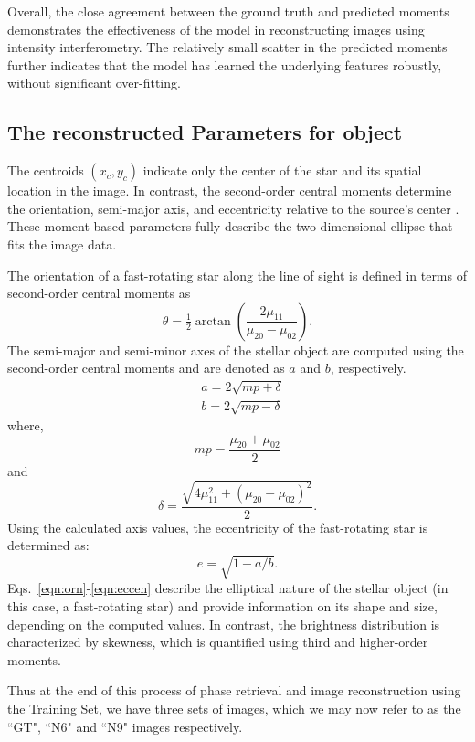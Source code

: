 Overall, the close agreement between the ground truth and predicted moments demonstrates the effectiveness of the model in reconstructing images using intensity interferometry. The relatively small scatter in the predicted moments further indicates that the model has learned the underlying features robustly, without significant over-fitting.

\subsection{The reconstructed Parameters for object}
The centroids \((x_c, y_c)\) indicate only the center of the star and its spatial location in the image. In contrast, the second-order central moments determine the orientation, semi-major axis, and eccentricity relative to the source's center \citep{teague1980image}. These moment-based parameters fully describe the two-dimensional ellipse that fits the image data.

The orientation of a fast-rotating star along the line of sight is defined in terms of second-order central moments as
\begin{equation}
	\theta = \tfrac{1}{2}\arctan \left(\frac{2\mu_{11}}{\mu_{20} - \mu_{02}}\right).
	\label{eqn:orn}
\end{equation}
The semi-major and semi-minor axes of the stellar object are computed using the second-order central moments and are denoted as \(a\) and \(b\), respectively.
\begin{equation}
	\begin{aligned}
		&a = 2\sqrt{mp + \delta} \\
		&b = 2\sqrt{mp - \delta}
	\end{aligned}
	\label{eqn:semi}
\end{equation}
where,
\begin{equation}
	mp = \frac{\mu_{20} + \mu_{02}}{2}
	\label{eqn:mp}
\end{equation}
and
\begin{equation}
	\delta = \frac{\sqrt{4\mu_{11}^2 + (\mu_{20} - \mu_{02})^2}}{2}.	
	\label{eqn:delta}
\end{equation}
Using the calculated axis values, the eccentricity of the fast-rotating star is determined as:
\begin{equation}
	e = \sqrt{1 - a/b}.
	\label{eqn:eccen}
\end{equation}
Eqs.~\ref{eqn:orn}-\ref{eqn:eccen} describe the elliptical nature of the stellar object (in this case, a fast-rotating star) and provide information on its shape and size, depending on the computed values. In contrast, the brightness distribution is characterized by skewness, which is quantified using third and higher-order moments.

Thus at the end of this process of phase retrieval and image reconstruction using the Training Set, we have three sets of images, which we may now refer to as the ``GT", ``N6" and ``N9" images respectively. 


